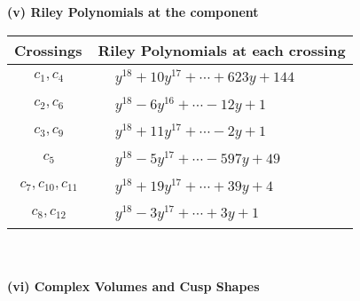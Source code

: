 \documentclass[1p]{elsarticle_modified}
\theoremstyle{definition}
\begin{document}
\newpage\renewcommand{\arraystretch}{1}
\flushleft \textbf{(v) Riley Polynomials at the component}\newline \\
\begin{tabular}{m{50pt}|m{274pt}}
Crossings & \hspace{64pt}Riley Polynomials at each crossing \\
\hline $$\begin{aligned}c_{1},c_{4}\end{aligned}$$&$\begin{aligned}
&y^{18}+10 y^{17}+\cdots+623 y+144
\end{aligned}$\\
\hline $$\begin{aligned}c_{2},c_{6}\end{aligned}$$&$\begin{aligned}
&y^{18}-6 y^{16}+\cdots-12 y+1
\end{aligned}$\\
\hline $$\begin{aligned}c_{3},c_{9}\end{aligned}$$&$\begin{aligned}
&y^{18}+11 y^{17}+\cdots-2 y+1
\end{aligned}$\\
\hline $$\begin{aligned}c_{5}\end{aligned}$$&$\begin{aligned}
&y^{18}-5 y^{17}+\cdots-597 y+49
\end{aligned}$\\
\hline $$\begin{aligned}c_{7},c_{10},c_{11}\end{aligned}$$&$\begin{aligned}
&y^{18}+19 y^{17}+\cdots+39 y+4
\end{aligned}$\\
\hline $$\begin{aligned}c_{8},c_{12}\end{aligned}$$&$\begin{aligned}
&y^{18}-3 y^{17}+\cdots+3 y+1
\end{aligned}$\\
\hline
\end{tabular}\\~\\
\newpage\flushleft \textbf{(vi) Complex Volumes and Cusp Shapes}
\end{document}
